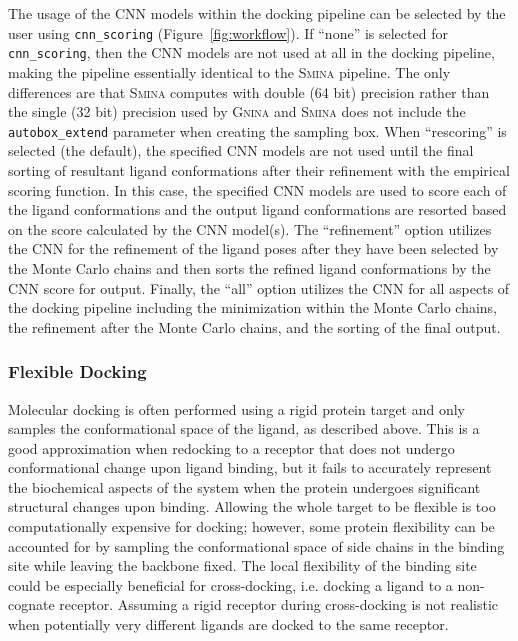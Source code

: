 \documentclass[linenumbers,doublespacing]{bmcart}
\begin{document}
The usage of the CNN models within the docking pipeline can be selected by the user using \texttt{cnn\_scoring} (Figure~\ref{fig:workflow}). If ``none'' is selected for \texttt{cnn\_scoring}, then the CNN models are not used at all in the docking pipeline, making the pipeline essentially identical to the \textsc{Smina} pipeline. The only differences are that \textsc{Smina} computes with double (64 bit) precision rather than the single (32 bit) precision used by \textsc{Gnina} and \textsc{Smina} does not include the \texttt{autobox\_extend} parameter when creating the sampling box. When ``rescoring'' is selected (the default), the specified CNN models are not used until the final sorting of resultant ligand conformations after their refinement with the empirical scoring function. In this case, the specified CNN models are used to score each of the ligand conformations and the output ligand conformations are resorted based on the score calculated by the CNN model(s). The ``refinement'' option utilizes the CNN for the refinement of the ligand poses after they have been selected by the Monte Carlo chains and then sorts the refined ligand conformations by the CNN score for output. Finally, the ``all'' option utilizes the CNN for all aspects of the docking pipeline including the minimization within the Monte Carlo chains, the refinement after the Monte Carlo chains, and the sorting of the final output. 

\subsubsection{Flexible Docking}

Molecular docking is often performed using a rigid protein target and only samples the conformational space of the ligand, as described above. This is a good approximation when redocking to a receptor that does not undergo conformational change upon ligand binding, but it fails to accurately represent the biochemical aspects of the system when the protein undergoes significant structural changes upon binding\cite{Teague2003}. Allowing the whole target to be flexible is too computationally expensive for docking; however, some protein flexibility can be accounted for by sampling the conformational space of side chains in the binding site\cite{Zhao2008} while leaving the backbone fixed. The local flexibility of the binding site could be especially beneficial for cross-docking, i.e. docking a ligand to a non-cognate receptor. Assuming a rigid receptor during cross-docking is not realistic when potentially very different ligands are docked to the same receptor.
\end{document}

